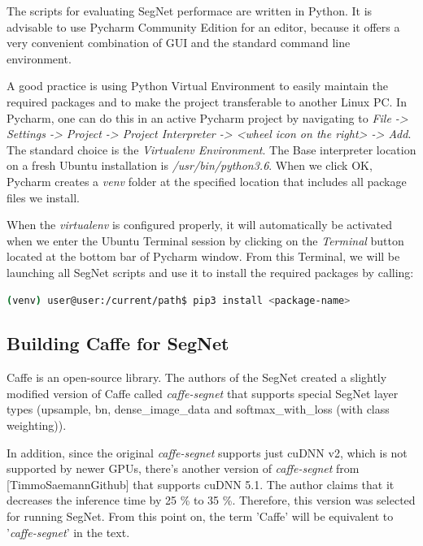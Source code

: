The scripts for evaluating SegNet performace are written in Python. It is advisable to use Pycharm Community Edition for an editor, because it offers a very convenient combination of GUI and the standard command line environment.

A good practice is using Python Virtual Environment to easily maintain the required packages and to make the project transferable to another Linux PC. In Pycharm, one can do this in an active Pycharm project by navigating to \textit{File -> Settings -> Project -> Project Interpreter -> <wheel icon on the right> -> Add}. The standard choice is the \textit{Virtualenv Environment}. The Base interpreter location on a fresh Ubuntu installation is \textit{/usr/bin/python3.6}. When we click OK, Pycharm creates a \textit{venv} folder at the specified location that includes all package files we install.

When the \textit{virtualenv} is configured properly, it will automatically be activated when we enter the Ubuntu Terminal session by clicking on the \textit{Terminal} button located at the bottom bar of Pycharm window. From this Terminal, we will be launching all SegNet scripts and use it to install the required packages by calling:

\begin{lstlisting}[language=bash]
(venv) user@user:/current/path$ pip3 install <package-name>
\end{lstlisting}

\subsection{Building Caffe for SegNet} 

Caffe is an open-source library. The authors of the SegNet created a slightly modified version of Caffe called \textit{caffe-segnet} that supports special SegNet layer types (upsample, bn, dense\_image\_data and softmax\_with\_loss (with class weighting)).

In addition, since the original \textit{caffe-segnet} supports just cuDNN v2, which is not supported by newer GPUs, there's another version of \textit{caffe-segnet} from [TimmoSaemannGithub] that supports cuDNN 5.1. The author claims that it decreases the inference time by 25 \% to 35 \%. Therefore, this version was selected for running SegNet. From this point on, the term 'Caffe' will be equivalent to '\textit{caffe-segnet}' in the text.

